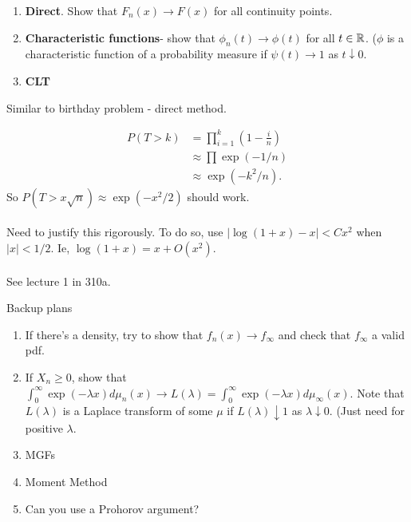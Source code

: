 \documentclass{article}
\newcommand{\answer}[1]{%
  \begin{tcolorbox}[
    colback=gray!9.8,
    boxrule=0.5pt,
    breakable]
  \small #1
  \end{tcolorbox}}
\begin{document}
\begin{enumerate}
	\item 	\textbf{\textbf{Direct}}. Show that $F_n(x) \to F(x)$ for all continuity points.
	\item \textbf{Characteristic functions}- show that $\phi_n(t) \to \phi(t)$ for all $t\in \mathbb R$. ($\phi$ is a characteristic function of a probability measure if $\psi(t) \to 1$ as $t\downarrow 0$. 
	\item \textbf{CLT} 

\end{enumerate}

\begin{example}
Similar to birthday problem - direct method. 
\answer{

\begin{align}
	P(T>k) & = \prod_{i=1}^k (1-\frac{i}{n})\\
	&\approx \prod \exp(-1/n)\\
	& \approx \exp(-k^2/n).
\end{align}
So $P(T> x\sqrt{n}) \approx \exp(-x^2/2)$ should work.\\\\
Need to justify this rigorously. To do so, use $|\log (1+x) - x| < Cx^2$ when $|x| <1/2$. Ie, $\log (1+x) = x + O(x^2)$. \\\\ 

See lecture 1 in 310a. 

}
\end{example}

Backup plans

\begin{enumerate}
	\item If there's a density, try to show that $f_n(x) \to f_\infty$ and check that $f_\infty$ a valid pdf. 
	\item If $X_n \geq 0$, show that $\int_0^\infty \exp(-\lambda x) d\mu_n (x) \to L(\lambda) = \int_0^\infty \exp(-\lambda x) d\mu_\infty (x)$. Note that $L(\lambda)$ is a Laplace transform of some $\mu$ if $L(\lambda)\downarrow 1$ as $\lambda\downarrow 0$. (Just need for positive $\lambda$. 
	\item MGFs
	\item Moment Method
	\item Can you use a Prohorov argument?
\end{enumerate}
\end{document}
